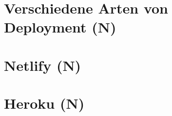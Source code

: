 \section{Verschiedene Arten von Deployment (N)}

\newpage
\section{Netlify (N)}


\section{Heroku (N)}
